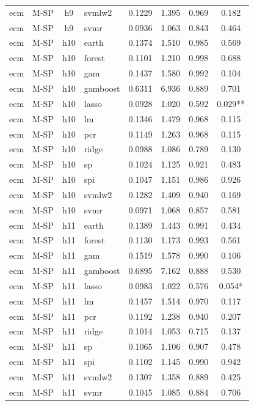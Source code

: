 \begin{ThreePartTable}
\begin{longtable}[t]{llclcccc}
ecm & M-SP & h9 & svmlw2 & 0.1229 & 1.395 & 0.969 & 0.182\\
ecm & M-SP & h9 & svmr & 0.0936 & 1.063 & 0.843 & 0.464\\
\addlinespace
ecm & M-SP & h10 & earth & 0.1374 & 1.510 & 0.985 & 0.569\\
ecm & M-SP & h10 & forest & 0.1101 & 1.210 & 0.998 & 0.688\\
ecm & M-SP & h10 & gam & 0.1437 & 1.580 & 0.992 & 0.104\\
ecm & M-SP & h10 & gamboost & 0.6311 & 6.936 & 0.889 & 0.701\\
ecm & M-SP & h10 & lasso & 0.0928 & 1.020 & 0.592 & 0.029**\\
ecm & M-SP & h10 & lm & 0.1346 & 1.479 & 0.968 & 0.115\\
ecm & M-SP & h10 & pcr & 0.1149 & 1.263 & 0.968 & 0.115\\
ecm & M-SP & h10 & ridge & 0.0988 & 1.086 & 0.789 & 0.130\\
ecm & M-SP & h10 & sp & 0.1024 & 1.125 & 0.921 & 0.483\\
ecm & M-SP & h10 & spi & 0.1047 & 1.151 & 0.986 & 0.926\\
ecm & M-SP & h10 & svmlw2 & 0.1282 & 1.409 & 0.940 & 0.169\\
ecm & M-SP & h10 & svmr & 0.0971 & 1.068 & 0.857 & 0.581\\
\addlinespace
ecm & M-SP & h11 & earth & 0.1389 & 1.443 & 0.991 & 0.434\\
ecm & M-SP & h11 & forest & 0.1130 & 1.173 & 0.993 & 0.561\\
ecm & M-SP & h11 & gam & 0.1519 & 1.578 & 0.990 & 0.106\\
ecm & M-SP & h11 & gamboost & 0.6895 & 7.162 & 0.888 & 0.530\\
ecm & M-SP & h11 & lasso & 0.0983 & 1.022 & 0.576 & 0.054*\\
ecm & M-SP & h11 & lm & 0.1457 & 1.514 & 0.970 & 0.117\\
ecm & M-SP & h11 & pcr & 0.1192 & 1.238 & 0.940 & 0.207\\
ecm & M-SP & h11 & ridge & 0.1014 & 1.053 & 0.715 & 0.137\\
ecm & M-SP & h11 & sp & 0.1065 & 1.106 & 0.907 & 0.478\\
ecm & M-SP & h11 & spi & 0.1102 & 1.145 & 0.990 & 0.942\\
ecm & M-SP & h11 & svmlw2 & 0.1307 & 1.358 & 0.889 & 0.425\\
ecm & M-SP & h11 & svmr & 0.1045 & 1.085 & 0.884 & 0.706\\

\end{longtable}
\end{ThreePartTable}
